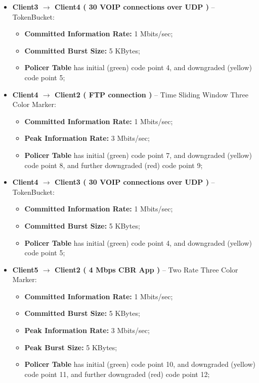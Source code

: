 \documentclass[conference,compsoc]{IEEEtran}
\begin{document}
\begin{itemize}
\begin{itemize}
		
		
		
		\item \textbf{Client3 $\rightarrow$ Client4 ( 30 VOIP connections over UDP )} -- TokenBucket:
   	  	\begin{itemize}
   	 	 \item \textbf{Committed Information Rate:} 1 Mbits/sec;
   		  \item \textbf{Committed Burst Size:} 5 KBytes;
  		   \item \textbf{Policer Table} has initial (green) code point 4, and downgraded (yellow) code point 5;
     		\end{itemize}

\item \textbf{Client4 $\rightarrow$ Client2  ( FTP connection )} -- Time Sliding Window Three Color Marker:
   	  	\begin{itemize}
   	 	 \item \textbf{Committed Information Rate:} 1 Mbits/sec;
		    \item \textbf{Peak Information Rate:} 3 Mbits/sec;
  		   \item \textbf{Policer Table} has initial (green) code point 7, and downgraded (yellow) code point 8, and further downgraded (red) code point 9;
     		\end{itemize}
		
		\item \textbf{Client4 $\rightarrow$ Client3 ( 30 VOIP connections over UDP )} -- TokenBucket:
   	  	\begin{itemize}
   	 	 \item \textbf{Committed Information Rate:} 1 Mbits/sec;
   		  \item \textbf{Committed Burst Size:} 5 KBytes;
  		   \item \textbf{Policer Table} has initial (green) code point 4, and downgraded (yellow) code point 5;
     		\end{itemize}
		

	\item \textbf{Client5 $\rightarrow$ Client2  ( 4 Mbps CBR App )} -- Two Rate Three Color Marker:
   	  	\begin{itemize}
   	 	 \item \textbf{Committed Information Rate:} 1 Mbits/sec;
   		  \item \textbf{Committed Burst Size:} 5 KBytes;
		    \item \textbf{Peak Information Rate:} 3 Mbits/sec;
		     \item \textbf{Peak Burst Size:} 5 KBytes;
  		   \item \textbf{Policer Table} has initial (green) code point 10, and downgraded (yellow) code point 11, and further downgraded (red) code point 12;
     		\end{itemize}
		

\end{itemize}
\end{itemize}
\end{document}
